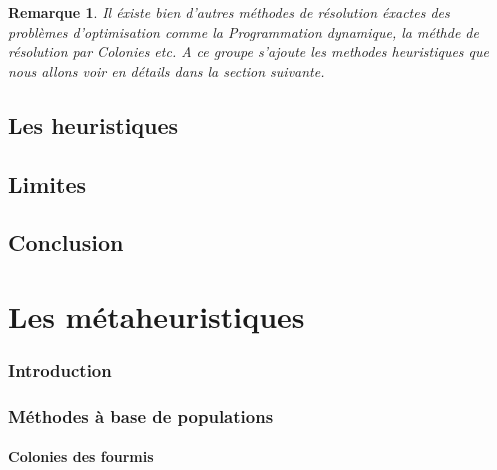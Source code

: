 \documentclass[a4paper,11pt,oneside]{report}
\newtheorem{remarque}{Remarque}[section]
\theoremstyle{plain}
\newcommand{\0}{/ \! \! \! 0}
\theoremstyle{plain}
\begin{document}
\begin{remarque}
Il \'existe bien d'autres m\'ethodes de r\'esolution \'exactes des probl\`emes d'optimisation comme la Programmation dynamique, la m\'ethde 
de r\'esolution par Colonies etc. A ce groupe s'ajoute les methodes heuristiques que nous allons voir en d\'etails dans la section suivante.
\end{remarque}
\section{Les heuristiques}




\section{Limites}



\section{Conclusion}


\chapter{Les m\'etaheuristiques}


\subsection{Introduction}
 
\subsection{M\'ethodes \`a base de populations}

\subsubsection{Colonies des fourmis}
\end{document}
